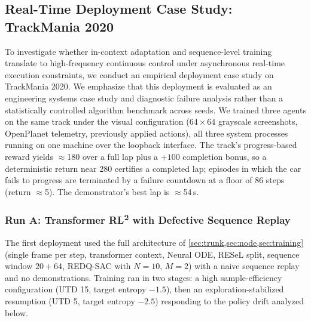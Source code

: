 \documentclass[conference]{IEEEtran}
\newcommand{\rltwo}{\texorpdfstring{RL\textsuperscript{2}}{RL2}}
\begin{document}
\subsection{Real-Time Deployment Case Study: TrackMania 2020}
\label{sec:tm_exp}
To investigate whether in-context adaptation and sequence-level training translate to high-frequency continuous control under asynchronous real-time execution constraints, we conduct an empirical deployment case study on TrackMania 2020. We emphasize that this deployment is evaluated as an engineering systems case study and diagnostic failure analysis rather than a statistically controlled algorithm benchmark across seeds. We trained three agents on the same track under the visual configuration ($64{\times}64$ grayscale screenshots, OpenPlanet telemetry, previously applied actions), all three system processes running on one machine over the loopback interface. The track's progress-based reward yields $\approx$180 over a full lap plus a $+100$ completion bonus, so a deterministic return near 280 certifies a completed lap; episodes in which the car fails to progress are terminated by a failure countdown at a floor of 86 steps (return $\approx$5). The demonstrator's best lap is $\approx$54\,s.

\subsubsection{Run A: Transformer \rltwo{} with Defective Sequence Replay}
\label{sec:runa}
The first deployment used the full architecture of \cref{sec:trunk,sec:node,sec:training} (single frame per step, transformer context, Neural ODE, RESeL split, sequence window $20+64$, REDQ-SAC with $N{=}10$, $M{=}2$) with a naive sequence replay and no demonstrations. Training ran in two stages: a high sample-efficiency configuration (UTD 15, target entropy $-1.5$), then an exploration-stabilized resumption (UTD 5, target entropy $-2.5$) responding to the policy drift analyzed below.
\end{document}
